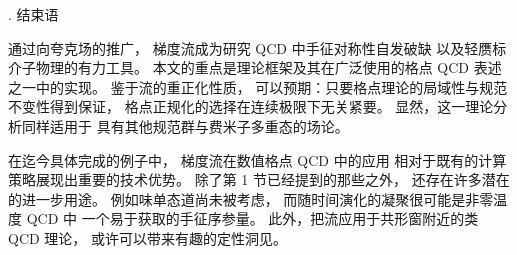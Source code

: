 
. 结束语

通过向夸克场的推广，
梯度流成为研究 QCD 中手征对称性自发破缺
以及轻赝标介子物理的有力工具。
本文的重点是理论框架及其在广泛使用的格点 QCD 表述之一中的实现。
鉴于流的重正化性质，
可以预期：只要格点理论的局域性与规范不变性得到保证，
格点正规化的选择在连续极限下无关紧要。
显然，这一理论分析同样适用于
具有其他规范群与费米子多重态的场论。

在迄今具体完成的例子中，
梯度流在数值格点 QCD 中的应用
相对于既有的计算策略展现出重要的技术优势。
除了第 1 节已经提到的那些之外，
还存在许多潜在的进一步用途。
例如味单态道尚未被考虑，
而随时间演化的凝聚很可能是非零温度 QCD 中
一个易于获取的手征序参量。
此外，把流应用于共形窗附近的类 QCD 理论，
或许可以带来有趣的定性洞见。
